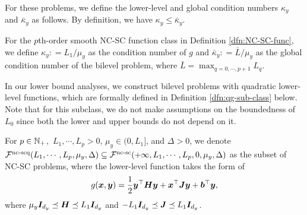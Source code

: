 \documentclass{article}
\begin{document}
For these problems, we define the lower-level and global condition numbers $\kappa_y$ and $\bar \kappa_y$
as follows. By definition, we have $\kappa_y \le \bar \kappa_y$.

\begin{dfn} \label{dfn:cond-number}
    For the $p$th-order smooth NC-SC function class in Definition \ref{dfn:NC-SC-func}, we define $\kappa_y: =L_1/\mu_y$ as the condition number of $g$  and $\bar \kappa_y: = \bar L / \mu_y$ as the global condition number of the bilevel problem, where $\bar L = \max_{q = 0,\cdots,p+1} L_q$.
\end{dfn}

In our lower bound analyses, we construct bilevel problems with quadratic lower-level functions, which are formally defined in Definition \ref{dfn:qg-sub-class} below. 
Note that for this subclass, we do not make assumptions on the boundedness of $L_0$ since both the lower and upper bounds do not depend on it.



\begin{dfn} \label{dfn:qg-sub-class}
For $p \in {\mathbb{N}}_+$,~$L_1,\cdots,L_p>0$, $\mu_y \in (0,L_1]$, and $\Delta>0$, we denote
${\mathcal{F}}^{\text{nc-scq}}(L_1,\cdots,L_{p},\mu_y, \Delta) \subseteq {\mathcal{F}}^{\text{nc-sc}}(+\infty, L_1,\cdots,L_p,0,\mu_y, \Delta)$
as the subset of NC-SC problems, where the lower-level function takes the form of
\begin{align} \label{eq:quadratic-g}
    g({\bm{x}},{\bm{y}}) = \frac{1}{2} {\bm{y}}^\top {\bm{H}} {\bm{y}}+ {\bm{x}}^\top {\bm{J}} {\bm{y}} +  {\bm{b}}^\top {\bm{y}},
\end{align}
where $\mu_y {\bm{I}}_{d_y} \preceq {\bm{H}} \preceq L_1 {\bm{I}}_{d_y}$ and $-L_1 {\bm{I}}_{d_y} \preceq {\bm{J}} \preceq L_1 {\bm{I}}_{d_y}$.
\end{dfn}
\end{document}
